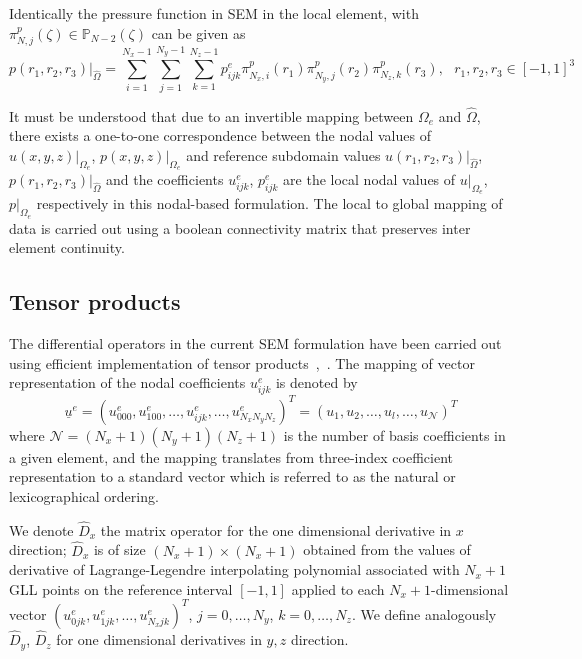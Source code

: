 \documentclass[times]{fldauth}
\begin{document}
Identically the pressure function in SEM in the local element, with $\pi^{p}_{N,j}({\zeta}) \in \mathbb{P}_{N-2}(\zeta)$ can be given as 
\begin{equation}
p(r_1,r_2,r_3)|_{\hat{\Omega}} = \displaystyle\sum_{i=1}^{N_x-1}\sum_{j=1}^{N_y-1}\sum_{k=1}^{N_z-1}p_{ijk}^{e}\pi^{p}_{N_x,i}({r_1})\pi^{p}_{N_y,j}({r_2})\pi^{p}_{N_z,k}({r_3}),  \ \ \ {r_1},{r_2},{r_3}\in [-1,1]^3
\end{equation}

It must be understood that due to an invertible mapping between $\Omega_{e}$ and $\hat{\Omega}$, there exists a one-to-one correspondence between the nodal values of $u(x,y,z)|_{\Omega_{e}}$, $p(x,y,z)|_{\Omega_{e}}$ and reference subdomain values $u(r_1,r_2,r_3)|_{\hat{\Omega}}$, $p(r_1,r_2,r_3)|_{\hat{\Omega}}$ and the coefficients $u_{ijk}^{e}$, $p_{ijk}^{e}$ are the local nodal values of $u|_{\Omega_{e}}$, $p|_{\Omega_{e}}$ respectively in this nodal-based formulation. The local to global mapping of data is carried out using a boolean connectivity matrix that preserves inter element continuity.

\subsection{Tensor products}
The differential operators in the current SEM formulation
have been carried out using efficient implementation of tensor products~\cite{lynch},~\cite{orz}. The mapping of vector representation of the nodal coefficients $u_{ijk}^{e}$ is denoted by
\begin{equation}
\underline{u}^{e} = (u_{000}^e, u_{100}^e, \ldots , u_{ijk}^e, \ldots, u_{N_xN_yN_z}^e)^T=(u_1, u_2,\ldots, u_l, \ldots, u_{\mathcal{N}})^T 
\end{equation}
where $\mathcal{N} = (N_x+1)(N_y+1)(N_z+1)$ is the number of basis coefficients in a given element, and the mapping translates from three-index coefficient representation to a standard vector which is referred to as the natural or lexicographical ordering.

We denote $\hat{D}_x$ the matrix operator for the one dimensional derivative in $x$ direction; $\hat{D}_x$ is of size $(N_x+1)\times (N_x+1)$ obtained from the values of derivative of Lagrange-Legendre interpolating polynomial associated with $N_x + 1$ GLL points on the reference interval $[-1, 1]$ applied to each $N_x+1$-dimensional vector $(u_{0jk}^e,u_{1jk}^e, \ldots, u_{N_xjk}^e)^T$, $j = 0, \ldots, N_y$, $k = 0, \ldots, N_z$. We define analogously $\hat{D}_y$, $\hat{D}_z$ for one dimensional derivatives in $y,z$ direction.
\end{document}

